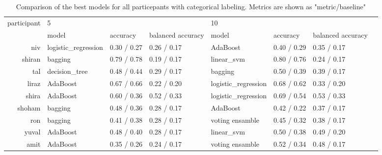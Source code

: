 

\begin{table}[!h]
    \begin{tabular}{rlllllll}
        \toprule
        participant &  \multicolumn{3}{l}{5} & \multicolumn{3}{l}{10} \\
              &                 model &     accuracy & balanced accuracy &                model &     accuracy & balanced accuracy \\
        \midrule
             niv &  logistic\_regression &  0.30 / 0.27 &       0.26 / 0.17 &             AdaBoost &  0.40 / 0.29 &       0.35 / 0.17 \\
          shiran &              bagging &  0.79 / 0.78 &       0.19 / 0.17 &           linear\_svm &  0.80 / 0.76 &       0.24 / 0.17 \\
             tal &        decision\_tree &  0.48 / 0.44 &       0.29 / 0.17 &              bagging &  0.50 / 0.39 &       0.39 / 0.17 \\
           liraz &             AdaBoost &  0.67 / 0.66 &       0.22 / 0.20 &  logistic\_regression &  0.68 / 0.62 &       0.33 / 0.20 \\
           shira &             AdaBoost &  0.60 / 0.36 &       0.52 / 0.33 &  logistic\_regression &  0.69 / 0.54 &       0.53 / 0.33 \\
          shoham &              bagging &  0.48 / 0.36 &       0.28 / 0.17 &             AdaBoost &  0.42 / 0.22 &       0.37 / 0.17 \\
             ron &              bagging &  0.41 / 0.38 &       0.28 / 0.17 &      voting ensamble &  0.45 / 0.32 &       0.38 / 0.17 \\
           yuval &             AdaBoost &  0.48 / 0.40 &       0.28 / 0.17 &           linear\_svm &  0.50 / 0.38 &       0.49 / 0.20 \\
            amit &             AdaBoost &  0.35 / 0.26 &       0.24 / 0.17 &      voting ensamble &  0.52 / 0.34 &       0.48 / 0.17 \\
        \bottomrule
    \end{tabular}
    \caption{Comparison of the best models for all particepants with categorical labeling. Metrics are shown as "metric/baseline"}
\end{table}


